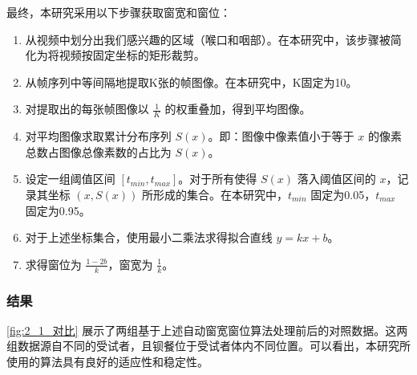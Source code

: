 最终，本研究采用以下步骤获取窗宽和窗位：
\begin{enumerate}
    \item 从视频中划分出我们感兴趣的区域（喉口和咽部）。在本研究中，该步骤被简化为将视频按固定坐标的矩形裁剪。
    \item 从帧序列中等间隔地提取K张的帧图像。在本研究中，K固定为10。
    \item 对提取出的每张帧图像以 $\frac{1}{K}$ 的权重叠加，得到平均图像。
    \item 对平均图像求取累计分布序列 $S(x)$。即：图像中像素值小于等于 $x$ 的像素总数占图像总像素数的占比为 $S(x)$。
    \item 设定一组阈值区间 $[t_{min}, t_{max}]$。对于所有使得 $S(x)$ 落入阈值区间的 $x$，记录其坐标 $(x, S(x))$ 所形成的集合。在本研究中，$t_{min}$ 固定为0.05，$t_{max}$ 固定为0.95。
    \item 对于上述坐标集合，使用最小二乘法求得拟合直线 $y=kx+b$。
    \item 求得窗位为 $\frac{1-2b}{k}$，窗宽为 $\frac{1}{k}$。
\end{enumerate}

\subsubsection{结果}

\cref{fig:2_1_对比} 展示了两组基于上述自动窗宽窗位算法处理前后的对照数据。这两组数据源自不同的受试者，且钡餐位于受试者体内不同位置。可以看出，本研究所使用的算法具有良好的适应性和稳定性。

